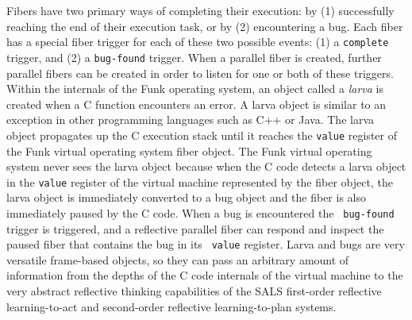 Fibers have two primary ways of completing their execution: by (1)
successfully reaching the end of their execution task, or by (2)
encountering a bug.  Each fiber has a special fiber trigger for each
of these two possible events: (1) a {\tt complete} trigger, and (2) a
{\tt bug-found} trigger.  When a parallel fiber is created, further
parallel fibers can be created in order to listen for one or both of
these triggers.  Within the internals of the Funk operating system, an
object called a \emph{larva} is created when a C function encounters
an error.  A larva object is similar to an exception in other
programming languages such as C++ or Java.  The larva object
propagates up the C execution stack until it reaches the {\tt value}
register of the Funk virtual operating system fiber object.  The Funk
virtual operating system never sees the larva object because when the
C code detects a larva object in the {\tt value} register of the
virtual machine represented by the fiber object, the larva object is
immediately converted to a bug object and the fiber is also
immediately paused by the C code.  When a bug is encountered the {\tt
  bug-found} trigger is triggered, and a reflective parallel fiber can
respond and inspect the paused fiber that contains the bug in its {\tt
  value} register.  Larva and bugs are very versatile frame-based
objects, so they can pass an arbitrary amount of information from the
depths of the C code internals of the virtual machine to the very
abstract reflective thinking capabilities of the SALS first-order
reflective learning-to-act and second-order reflective
learning-to-plan systems.




